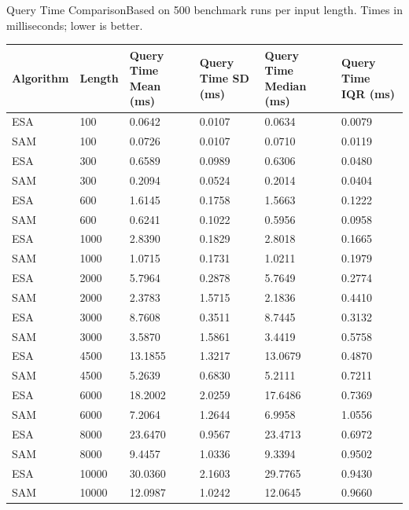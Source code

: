 \begin{benchmarktable}{Query Time Comparison}{Based on 500 benchmark runs per input length. Times in milliseconds; lower is better.}
\begin{tabularx}{\textwidth}{|X|X|X|X|X|X|}
\toprule
Algorithm & Length & Query Time Mean (ms) & Query Time SD (ms) & Query Time Median (ms) & Query Time IQR (ms) \\
\midrule
ESA & 100 & 0.0642 & 0.0107 & 0.0634 & 0.0079 \\
SAM & 100 & 0.0726 & 0.0107 & 0.0710 & 0.0119 \\
\hline
ESA & 300 & 0.6589 & 0.0989 & 0.6306 & 0.0480 \\
SAM & 300 & 0.2094 & 0.0524 & 0.2014 & 0.0404 \\
\hline
ESA & 600 & 1.6145 & 0.1758 & 1.5663 & 0.1222 \\
SAM & 600 & 0.6241 & 0.1022 & 0.5956 & 0.0958 \\
\hline
ESA & 1000 & 2.8390 & 0.1829 & 2.8018 & 0.1665 \\
SAM & 1000 & 1.0715 & 0.1731 & 1.0211 & 0.1979 \\
\hline
ESA & 2000 & 5.7964 & 0.2878 & 5.7649 & 0.2774 \\
SAM & 2000 & 2.3783 & 1.5715 & 2.1836 & 0.4410 \\
\hline
ESA & 3000 & 8.7608 & 0.3511 & 8.7445 & 0.3132 \\
SAM & 3000 & 3.5870 & 1.5861 & 3.4419 & 0.5758 \\
\hline
ESA & 4500 & 13.1855 & 1.3217 & 13.0679 & 0.4870 \\
SAM & 4500 & 5.2639 & 0.6830 & 5.2111 & 0.7211 \\
\hline
ESA & 6000 & 18.2002 & 2.0259 & 17.6486 & 0.7369 \\
SAM & 6000 & 7.2064 & 1.2644 & 6.9958 & 1.0556 \\
\hline
ESA & 8000 & 23.6470 & 0.9567 & 23.4713 & 0.6972 \\
SAM & 8000 & 9.4457 & 1.0336 & 9.3394 & 0.9502 \\
\hline
ESA & 10000 & 30.0360 & 2.1603 & 29.7765 & 0.9430 \\
SAM & 10000 & 12.0987 & 1.0242 & 12.0645 & 0.9660 \\
\bottomrule
\end{tabularx}
\end{benchmarktable}

